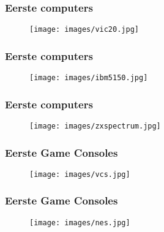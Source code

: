 \documentclass[aspectratio=43]{uva-inf-presentation}
\begin{document}

\begin{frame}
\frametitle{Eerste computers}

\begin{figure}
\texttt{[image: images/vic20.jpg]}
\end{figure}

\end{frame}


\begin{frame}
\frametitle{Eerste computers}

\begin{figure}
\texttt{[image: images/ibm5150.jpg]}
\end{figure}

\end{frame}


\begin{frame}
\frametitle{Eerste computers}

\begin{figure}
\texttt{[image: images/zxspectrum.jpg]}
\end{figure}

\end{frame}


\begin{frame}
\frametitle{Eerste Game Consoles}

\begin{figure}
\texttt{[image: images/vcs.jpg]}
\end{figure}

\end{frame}


\begin{frame}
\frametitle{Eerste Game Consoles}

\begin{figure}
\texttt{[image: images/nes.jpg]}
\end{figure}

\end{frame}

\end{document}
